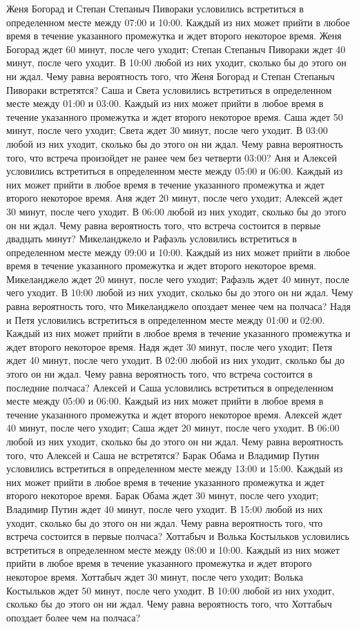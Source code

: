 Женя Богорад и Степан Степаныч Пивораки условились встретиться в определенном месте между 07:00 и 10:00. Каждый из них может прийти в любое время в течение указанного промежутка и ждет второго некоторое время. Женя Богорад ждет 60 минут, после чего уходит; Степан Степаныч Пивораки ждет 40 минут, после чего уходит. В 10:00 любой из них уходит, сколько бы до этого он ни ждал. Чему равна вероятность того, что Женя Богорад и Степан Степаныч Пивораки встретятся?
Саша и Света условились встретиться в определенном месте между 01:00 и 03:00. Каждый из них может прийти в любое время в течение указанного промежутка и ждет второго некоторое время. Саша ждет 50 минут, после чего уходит; Света ждет 30 минут, после чего уходит. В 03:00 любой из них уходит, сколько бы до этого он ни ждал. Чему равна вероятность того, что встреча произойдет не ранее чем без четверти 03:00?
Аня и Алексей условились встретиться в определенном месте между 05:00 и 06:00. Каждый из них может прийти в любое время в течение указанного промежутка и ждет второго некоторое время. Аня ждет 20 минут, после чего уходит; Алексей ждет 30 минут, после чего уходит. В 06:00 любой из них уходит, сколько бы до этого он ни ждал. Чему равна вероятность того, что встреча состоится в первые двадцать минут?
Микеланджело и Рафаэль условились встретиться в определенном месте между 09:00 и 10:00. Каждый из них может прийти в любое время в течение указанного промежутка и ждет второго некоторое время. Микеланджело ждет 20 минут, после чего уходит; Рафаэль ждет 40 минут, после чего уходит. В 10:00 любой из них уходит, сколько бы до этого он ни ждал. Чему равна вероятность того, что Микеланджело опоздает менее чем на полчаса?
Надя и Петя условились встретиться в определенном месте между 01:00 и 02:00. Каждый из них может прийти в любое время в течение указанного промежутка и ждет второго некоторое время. Надя ждет 30 минут, после чего уходит; Петя ждет 40 минут, после чего уходит. В 02:00 любой из них уходит, сколько бы до этого он ни ждал. Чему равна вероятность того, что встреча состоится в последние полчаса?
Алексей и Саша условились встретиться в определенном месте между 05:00 и 06:00. Каждый из них может прийти в любое время в течение указанного промежутка и ждет второго некоторое время. Алексей ждет 40 минут, после чего уходит; Саша ждет 20 минут, после чего уходит. В 06:00 любой из них уходит, сколько бы до этого он ни ждал. Чему равна вероятность того, что Алексей и Саша не встретятся?
Барак Обама и Владимир Путин условились встретиться в определенном месте между 13:00 и 15:00. Каждый из них может прийти в любое время в течение указанного промежутка и ждет второго некоторое время. Барак Обама ждет 30 минут, после чего уходит; Владимир Путин ждет 40 минут, после чего уходит. В 15:00 любой из них уходит, сколько бы до этого он ни ждал. Чему равна вероятность того, что встреча состоится в первые полчаса?
Хоттабыч и Волька Костыльков условились встретиться в определенном месте между 08:00 и 10:00. Каждый из них может прийти в любое время в течение указанного промежутка и ждет второго некоторое время. Хоттабыч ждет 30 минут, после чего уходит; Волька Костыльков ждет 50 минут, после чего уходит. В 10:00 любой из них уходит, сколько бы до этого он ни ждал. Чему равна вероятность того, что Хоттабыч опоздает более чем на полчаса?